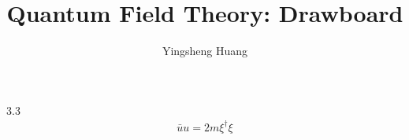 \documentclass{article}
\title{Quantum Field Theory: Drawboard}
\author{Yingsheng Huang}
\begin{document}
\maketitle

3.3
\begin{align*}
  \bar u u=2m \xi^{\dagger}\xi
\end{align*}
\end{document}
